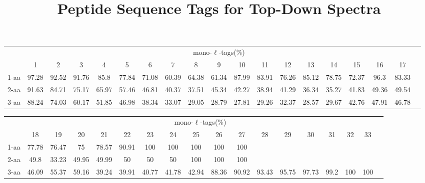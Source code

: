 \documentclass{article}[12pt]
\title{Peptide Sequence Tags for Top-Down Spectra}
\author{}
\begin{document}
\maketitle

\doublespacing
\begin{abstract}


\end{abstract}


\begin{landscape}

\begin{table}[h]\tiny
\vspace{3mm}
{\centering
\begin{center}
\begin{tabular}{|l|c|c|c|c|c|c|c|c|c|c|c|c|c|c|c|c|c|c|}
  \hline
  & \multicolumn{ 17 }{|c|}{mono-$\ell$-tags(\%)} \\
  \cline{2- 18}
    & 1 & 2 & 3 & 4 & 5 & 6 & 7 & 8 & 9 & 10 & 11 & 12 & 13 & 14 & 15 & 16 & 17\\
  \hline
1-aa  & 97.28 & 92.52 & 91.76 & 85.8 & 77.84 & 71.08 & 60.39 & 64.38 & 61.34 & 87.99 & 83.91 & 76.26 & 85.12 & 78.75 & 72.37 & 96.3 & 83.33\\
2-aa  & 91.63 & 84.71 & 75.17 & 65.97 & 57.46 & 46.81 & 40.37 & 37.51 & 45.34 & 42.27 & 38.94 & 41.29 & 36.34 & 35.27 & 41.83 & 49.36 & 49.54\\
3-aa  & 88.24 & 74.03 & 60.17 & 51.85 & 46.98 & 38.34 & 33.07 & 29.05 & 28.79 & 27.81 & 29.26 & 32.37 & 28.57 & 29.67 & 42.76 & 47.91 & 46.78\\
 \hline
\end{tabular}
\end{center}
\par}
\centering

\vspace{3mm}
\end{table}
\begin{table}[h]\tiny
\vspace{3mm}
{\centering
\begin{center}
\begin{tabular}{|l|c|c|c|c|c|c|c|c|c|c|c|c|c|c|c|c|c|}
  \hline
  & \multicolumn{ 16 }{|c|}{mono-$\ell$-tags(\%)} \\
  \cline{2- 17}
    & 18 & 19 & 20 & 21 & 22 & 23 & 24 & 25 & 26 & 27 & 28 & 29 & 30 & 31 & 32 & 33\\
  \hline
1-aa  & 77.78 & 76.47 & 75 & 78.57 & 90.91 & 100 & 100 & 100 & 100 & 100 &  &  &  &  &  & \\
2-aa  & 49.8 & 33.23 & 49.95 & 49.99 & 50 & 50 & 50 & 100 & 100 & 100 &  &  &  &  &  & \\
3-aa  & 46.09 & 55.37 & 59.16 & 39.24 & 39.91 & 40.77 & 41.78 & 42.94 & 88.36 & 90.92 & 93.43 & 95.75 & 97.73 & 99.2 & 100 & 100\\
 \hline
\end{tabular}
\end{center}
\par}
\centering


\end{table}
\end{landscape}
\end{document}
